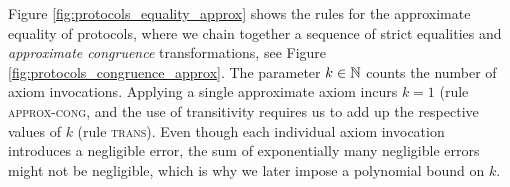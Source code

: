 \begin{figure*}
\caption{Approximate congruence of \ipdl protocols.}
\label{fig:protocols_congruence_approx}
\end{figure*}

\begin{figure*}
\caption{Approximate equality for \ipdl protocols.}
\label{fig:protocols_equality_approx}
\end{figure*}

Figure \ref{fig:protocols_equality_approx} shows the rules for the approximate equality of \ipdl protocols, where we chain together a sequence of strict equalities and \emph{approximate congruence} transformations, see Figure \ref{fig:protocols_congruence_approx}. The parameter $k \in \mathbb{N}$ counts the number of axiom invocations. Applying a single approximate axiom incurs $k = 1$ (rule \textsc{approx-cong}, and the use of transitivity requires us to add up the respective values of $k$ (rule \textsc{trans}). Even though each individual axiom invocation introduces a negligible error, the sum of exponentially many negligible errors might not be negligible, which is why we later impose a polynomial bound on $k$.

